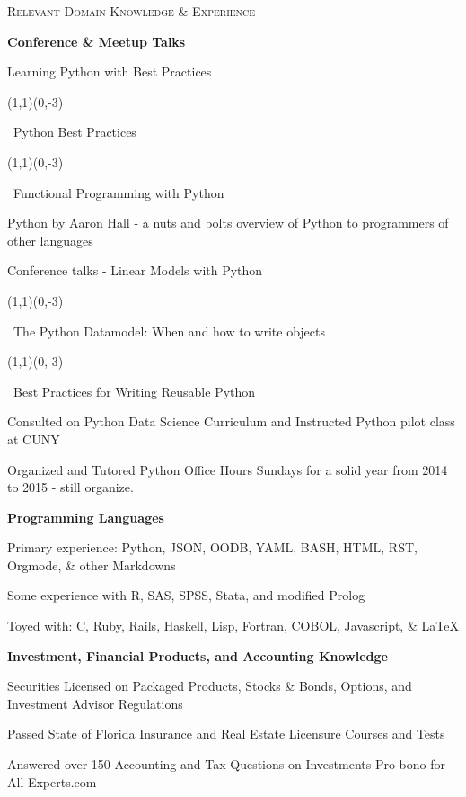 \documentclass[letterpaper,10pt]{article}
\date{08/22/11}
\newcommand{\sbullet}{\,\begin{picture}(1,1)(0,-3)\circle*{3}\end{picture}\ }
\begin{document}
\textsc{Relevant Domain Knowledge \& Experience}
\vspace{.5mm}
  \hline
{\addtolength{\leftskip}{0mm} \textbf{Conference \& Meetup Talks}

\vspace{-2mm} {\addtolength{\leftskip}{0mm}
\begin{itemize}\setlength{\itemsep}{0cm}\setlength{\parskip}{0cm} {\addtolength{\leftskip}{-5mm}
  \item Learning Python with Best Practices \sbullet Python Best Practices \sbullet Functional Programming with Python
  \item Python by Aaron Hall - a nuts and bolts overview of Python to programmers of other languages
  \item Conference talks - Linear Models with Python \sbullet The Python Datamodel: When and how to write objects 
        \sbullet Best Practices for Writing Reusable Python
  \item Consulted on Python Data Science Curriculum and Instructed Python pilot class at CUNY
  \item Organized and Tutored Python Office Hours Sundays for a solid year from 2014 to 2015 - still organize.

}
\end{itemize}

}}

\vspace{-1mm}
{\addtolength{\leftskip}{0mm} \textbf{Programming Languages}

\vspace{-2mm} {\addtolength{\leftskip}{0mm}
\begin{itemize}\setlength{\itemsep}{0cm}\setlength{\parskip}{0cm} {\addtolength{\leftskip}{-5mm}
  \item Primary experience: Python, JSON, OODB, YAML, BASH, HTML, RST, Orgmode, \& other Markdowns
  \item Some experience with R, SAS, SPSS, Stata, and modified Prolog
  \item Toyed with: C, Ruby, Rails, Haskell, Lisp, Fortran, COBOL, Javascript, \& \LaTeX  

}
\end{itemize}

}}

\vspace{-1mm}
{\addtolength{\leftskip}{0mm} \textbf{Investment, Financial Products, and Accounting Knowledge}

\vspace{-2mm} {\addtolength{\leftskip}{0mm}
\begin{itemize}\setlength{\itemsep}{0cm}\setlength{\parskip}{0cm} {\addtolength{\leftskip}{-5mm}
  \item Securities Licensed on Packaged Products, Stocks & Bonds, Options, and Investment Advisor Regulations
  \item Passed State of Florida Insurance and Real Estate Licensure Courses and Tests
  \item Answered over 150 Accounting and Tax Questions on Investments Pro-bono for All-Experts.com

}
\end{itemize}

}}
\end{document}
